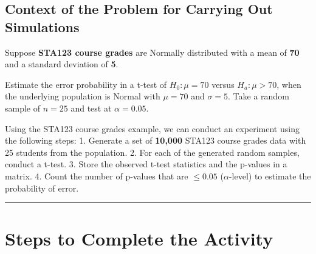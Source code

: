 \documentclass[oneside,openany]{book}
\begin{document}
\subsection{Context of the Problem for Carrying Out Simulations}\label{context-of-the-problem-for-carrying-out-simulations-1}

Suppose \textbf{STA123 course grades} are Normally distributed with a mean of \textbf{70} and a standard deviation of \textbf{5}.

Estimate the error probability in a t-test of \(H_0: \mu = 70\) versus \(H_a: \mu > 70\), when the underlying population is Normal with \(\mu = 70\) and \(\sigma = 5\). Take a random sample of \(n = 25\) and test at \(\alpha = 0.05\).

Using the STA123 course grades example, we can conduct an experiment using the following steps:
1. Generate a set of \textbf{10,000} STA123 course grades data with 25 students from the population.
2. For each of the generated random samples, conduct a t-test.
3. Store the observed t-test statistics and the p-values in a matrix.
4. Count the number of p-values that are \(\leq 0.05\) (\(\alpha\)-level) to estimate the probability of error.

\begin{center}\rule{0.5\linewidth}{0.5pt}\end{center}

\section{Steps to Complete the Activity}\label{steps-to-complete-the-activity-1}
\end{document}
